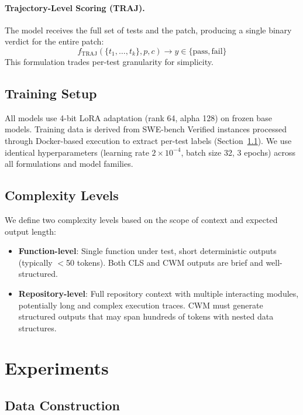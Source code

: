 \documentclass[11pt]{article}
\begin{document}
\paragraph{Trajectory-Level Scoring (TRAJ).}
The model receives the full set of tests and the patch, producing a single binary verdict for the entire patch:
\[
f_{\text{TRAJ}}(\{t_1, \ldots, t_k\}, p, c) \rightarrow y \in \{\text{pass}, \text{fail}\}
\]
This formulation trades per-test granularity for simplicity.

\subsection{Training Setup}

All models use 4-bit LoRA adaptation (rank 64, alpha 128) on frozen base models. Training data is derived from SWE-bench Verified instances processed through Docker-based execution to extract per-test labels (Section~\ref{sec:data}). We use identical hyperparameters (learning rate $2 \times 10^{-4}$, batch size 32, 3 epochs) across all formulations and model families.

\subsection{Complexity Levels}

We define two complexity levels based on the scope of context and expected output length:

\begin{itemize}
    \item \textbf{Function-level}: Single function under test, short deterministic outputs (typically $<$50 tokens). Both CLS and CWM outputs are brief and well-structured.
    \item \textbf{Repository-level}: Full repository context with multiple interacting modules, potentially long and complex execution traces. CWM must generate structured outputs that may span hundreds of tokens with nested data structures.
\end{itemize}

\section{Experiments}
\label{sec:experiments}

\subsection{Data Construction}
\label{sec:data}
\end{document}
